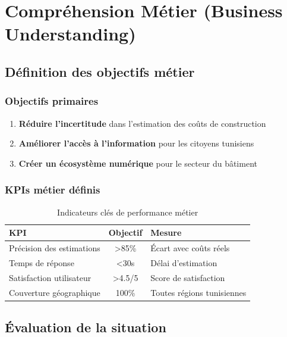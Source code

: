 \documentclass[12pt,a4paper]{report}
\begin{document}
\chapter{Compréhension Métier (Business Understanding)}

\section{Définition des objectifs métier}

\subsection{Objectifs primaires}

\begin{enumerate}
    \item \textbf{Réduire l'incertitude} dans l'estimation des coûts de construction
    \item \textbf{Améliorer l'accès à l'information} pour les citoyens tunisiens
    \item \textbf{Créer un écosystème numérique} pour le secteur du bâtiment
\end{enumerate}

\subsection{KPIs métier définis}

\begin{table}[H]
    \centering
    \caption{Indicateurs clés de performance métier}
    \begin{tabular}{|l|c|l|}
        \hline
        \textbf{KPI} & \textbf{Objectif} & \textbf{Mesure} \\
        \hline
        Précision des estimations & >85\% & Écart avec coûts réels \\
        \hline
        Temps de réponse & <30s & Délai d'estimation \\
        \hline
        Satisfaction utilisateur & >4.5/5 & Score de satisfaction \\
        \hline
        Couverture géographique & 100\% & Toutes régions tunisiennes \\
        \hline
    \end{tabular}
\end{table}

\section{Évaluation de la situation}
\end{document}
